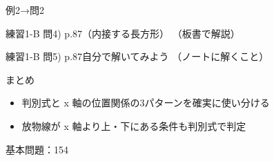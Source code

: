 \documentclass[aspectratio=43,professionalfonts,handout]{beamer}
\begin{document}
\begin{frame}{例2→問2}
  \begin{exampleblock}{練習1-B 問4) p.87（内接する長方形）}
    （板書で解説）
  \end{exampleblock}

  \vfill

  \begin{block}{練習1-B 問5) p.87\quad 自分で解いてみよう}
    （ノートに解くこと）
  \end{block}
\end{frame}

\begin{frame}{まとめ}
  \begin{itemize}
    \item 判別式と x 軸の位置関係の3パターンを確実に使い分ける
    \item 放物線が x 軸より上・下にある条件も判別式で判定
  \end{itemize}

  \vfill
  {\small 基本問題：154}
\end{frame}
\end{document}
